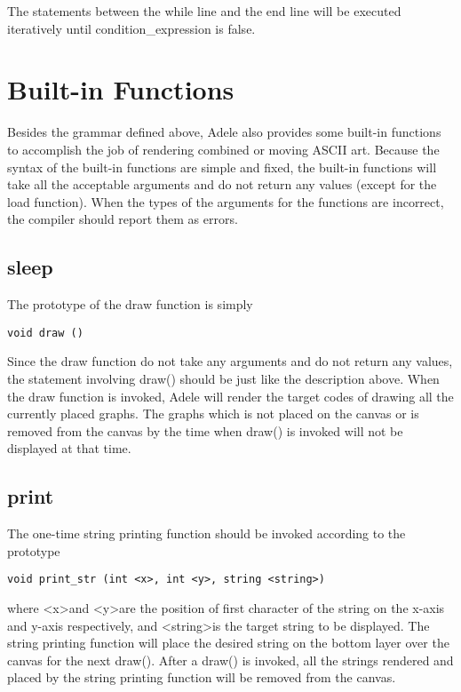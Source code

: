 \documentclass[11pt,letterpaper]{article}
\begin{document}
The statements between the while line and the end line will be executed iteratively until condition\_expression is false.

\section {Built-in Functions}
Besides the grammar defined above, Adele also provides some built-in functions to accomplish the job of rendering combined or moving ASCII art. Because the syntax of the built-in functions are simple and fixed, the built-in functions will take all the acceptable arguments and do not return any values (except for the load function). When the types of the arguments for the functions are incorrect, the compiler should report them as errors.

\subsection {sleep}
The prototype of the draw function is simply
\begin{lstlisting}[tabsize=4]
	void draw ()
\end{lstlisting}
Since the draw function do not take any arguments and do not return any values, the statement involving draw() should be just like the description above. When the draw function is invoked, Adele will render the target codes of drawing all the currently placed graphs. The graphs which is not placed on the canvas or is removed from the canvas by the time when draw() is invoked will not be displayed at that time.

\subsection {print}
The one-time string printing function should be invoked according to the prototype
\begin{lstlisting}[tabsize=4]
	void print_str (int <x>, int <y>, string <string>)
\end{lstlisting}
where \textless x\textgreater and \textless y\textgreater are the position of first character of the string on the x-axis and y-axis respectively, and \textless string\textgreater is the target string to be displayed. The string printing function will place the desired string on the bottom layer over the canvas for the next draw(). After a draw() is invoked, all the strings rendered and placed by the string printing function will be removed from the canvas.
\end{document}
